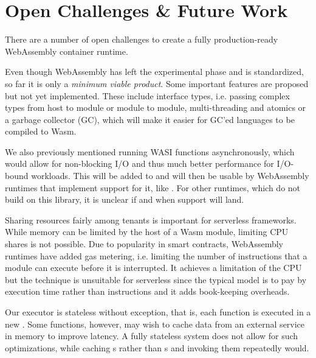 

\section{Open Challenges \& Future Work}

There are a number of open challenges to create a fully production-ready WebAssembly container runtime.

Even though WebAssembly has left the experimental phase and is standardized, so far it is only a \emph{minimum viable product}. Some important features are proposed but not yet implemented. These include interface types, i.e. passing complex types from host to module or module to module, multi-threading and atomics or a garbage collector (GC), which will make it easier for GC'ed languages to be compiled to Wasm.

We also previously mentioned running WASI functions asynchronously, which would allow for non-blocking I/O and thus much better performance for I/O-bound workloads. This will be added to  and will then be usable by WebAssembly runtimes that implement support for it, like . For other runtimes, which do not build on this library, it is unclear if and when support will land.

Sharing resources fairly among tenants is important for serverless frameworks. While memory can be limited by the host of a Wasm module, limiting CPU shares is not possible. Due to popularity in smart contracts, WebAssembly runtimes have added gas metering, i.e. limiting the number of instructions that a module can execute before it is interrupted. It achieves a limitation of the CPU but the technique is unsuitable for serverless since the typical model is to pay by execution time rather than instructions and it adds book-keeping overheads.

Our executor is stateless without exception, that is, each function is executed in a new . Some functions, however, may wish to cache data from an external service in memory to improve latency. A fully stateless system does not allow for such optimizations, while caching s rather than s and invoking them repeatedly would.

